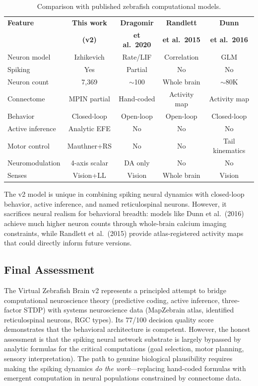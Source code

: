 \documentclass[11pt,a4paper]{article}
\begin{document}
\begin{table}[H]
\centering
\caption{Comparison with published zebrafish computational models.}
\label{tab:comparison}
\begin{tabular}{@{}lcccc@{}}
\toprule
\textbf{Feature} & \textbf{This work} & \textbf{Dragomir} & \textbf{Randlett} & \textbf{Dunn} \\
 & \textbf{(v2)} & \textbf{et al.\ 2020} & \textbf{et al.\ 2015} & \textbf{et al.\ 2016} \\
\midrule
Neuron model     & Izhikevich    & Rate/LIF        & Correlation  & GLM \\
Spiking          & Yes           & Partial         & No           & No \\
Neuron count     & 7,369         & $\sim$100       & Whole brain  & $\sim$80K \\
Connectome       & MPIN partial  & Hand-coded      & Activity map & Activity map \\
Behavior         & Closed-loop   & Open-loop       & Open-loop    & Closed-loop \\
Active inference & Analytic EFE  & No              & No           & No \\
Motor control    & Mauthner+RS   & No              & No           & Tail kinematics \\
Neuromodulation  & 4-axis scalar & DA only         & No           & No \\
Senses           & Vision+LL     & Vision          & Whole brain  & Vision \\
\bottomrule
\end{tabular}
\end{table}

\noindent The v2 model is unique in combining spiking neural dynamics with
closed-loop behavior, active inference, and named reticulospinal neurons.
However, it sacrifices neural realism for behavioral breadth: models like
Dunn et al.\ (2016) achieve much higher neuron counts through whole-brain
calcium imaging constraints, while Randlett et al.\ (2015) provide atlas-registered
activity maps that could directly inform future versions.

\subsection{Final Assessment}

The Virtual Zebrafish Brain v2 represents a principled attempt to bridge
computational neuroscience theory (predictive coding, active inference,
three-factor STDP) with systems neuroscience data (MapZebrain atlas,
identified reticulospinal neurons, RGC types).  Its 77/100 decision quality
score demonstrates that the behavioral architecture is competent.
However, the honest assessment is that the spiking neural network substrate
is largely bypassed by analytic formulas for the critical computations
(goal selection, motor planning, sensory interpretation).
The path to genuine biological plausibility requires making the spiking dynamics
\emph{do the work}---replacing hand-coded formulas with emergent computation
in neural populations constrained by connectome data.
\end{document}
